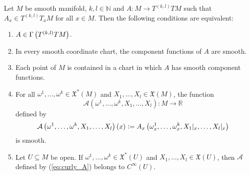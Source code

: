 \begin{proposition}
	\label{prop:smoothness_criteria_for_tensor_fields}
	Let $M$ be smooth manifold, $k,l \in \mathbb{N}$ and $A : M \to T^{(k,l)}TM$ such that $A_x \in T^{(k,l)}T_xM$ for all $x \in M$. Then the following conditions are equivalent:
	\begin{enumerate}[label = \textup{(\alph*\textup)},leftmargin=*]
		\item $A \in \Gamma\del[1]{T^{(k,l)}TM}$.
		\item In every smooth coordinate chart, the component functions of $A$ are smooth.
		\item Each point of $M$ is contained in a chart in which $A$ has smooth component functions.
		\item For all $\omega^1,\dots,\omega^k \in \mathfrak{X}^*(M)$ and $X_1,\dots,X_l \in \mathfrak{X}(M)$, the function 
			\begin{equation*}
				\mathcal{A}(\omega^1,\dots,\omega^k,X_1,\dots,X_l) : M \to \mathbb{R}
			\end{equation*}
			\noindent defined by
			\begin{equation}
				\label{eq:curly_A}
				\mathcal{A}\del[1]{\omega^1,\dots,\omega^k,X_1,\dots,X_l}(x) := A_x\del[1]{\omega^1_x,\dots,\omega^k_x, X_1\vert_x,\dots,X_l\vert_x}
			\end{equation}
			\noindent is smooth.
		\item Let $U \subseteq M$ be open. If $\omega^1,\dots,\omega^k \in \mathfrak{X}^*(U)$ and $X_1,\dots,X_l \in \mathfrak{X}(U)$, then $\mathcal{A}$ defined by \textup{(\ref{eq:curly_A})} belongs to $C^\infty(U)$.
	\end{enumerate}
\end{proposition}


